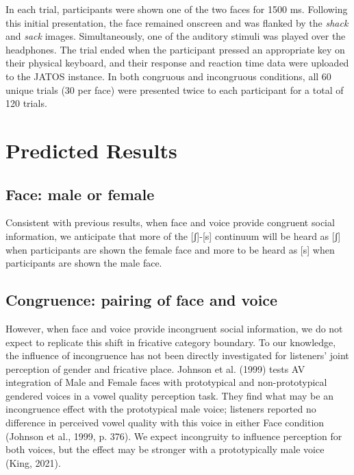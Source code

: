 \documentclass[
  letterpaper,
  DIV=11,
  numbers=noendperiod]{scrartcl}
\begin{document}
In each trial, participants were shown one of the two faces for 1500 ms.
Following this initial presentation, the face remained onscreen and was
flanked by the \emph{shack} and \emph{sack} images. Simultaneously, one
of the auditory stimuli was played over the headphones. The trial ended
when the participant pressed an appropriate key on their physical
keyboard, and their response and reaction time data were uploaded to the
JATOS instance. In both congruous and incongruous conditions, all 60
unique trials (30 per face) were presented twice to each participant for
a total of 120 trials.

\section{Predicted Results}\label{sec-predictions}

\subsection{Face: male or female}\label{sec-pred-face}

Consistent with previous results, when face and voice provide congruent
social information, we anticipate that more of the {[}ʃ{]}-{[}s{]}
continuum will be heard as {[}ʃ{]} when participants are shown the
female face and more to be heard as {[}s{]} when participants are shown
the male face.

\subsection{Congruence: pairing of face and
voice}\label{sec-pred-congruence}

However, when face and voice provide incongruent social information, we
do not expect to replicate this shift in fricative category boundary. To
our knowledge, the influence of incongruence has not been directly
investigated for listeners' joint perception of gender and fricative
place. Johnson et al. (1999) tests AV integration of Male and Female
faces with prototypical and non-prototypical gendered voices in a vowel
quality perception task. They find what may be an incongruence effect
with the prototypical male voice; listeners reported no difference in
perceived vowel quality with this voice in either Face condition
(Johnson et al., 1999, p. 376). We expect incongruity to influence
perception for both voices, but the effect may be stronger with a
prototypically male voice (King, 2021).
\end{document}
